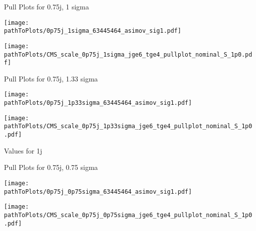 \begin{frame}{Pull Plots for 0.75j, 1 sigma}
\begin{minipage}{0.48\textwidth}
\centering
\texttt{[image: \\pathToPlots/0p75j\_1sigma\_63445464\_asimov\_sig1.pdf]}
\end{minipage}
\hfill
\begin{minipage}{0.48\textwidth}
\texttt{[image: \\pathToPlots/CMS\_scale\_0p75j\_1sigma\_jge6\_tge4\_pullplot\_nominal\_S\_1p0.pdf]}
\end{minipage}
\end{frame}


\begin{frame}{Pull Plots for 0.75j, 1.33 sigma}
\begin{minipage}{0.48\textwidth}
\centering
\texttt{[image: \\pathToPlots/0p75j\_1p33sigma\_63445464\_asimov\_sig1.pdf]}
\end{minipage}
\hfill
\begin{minipage}{0.48\textwidth}
\texttt{[image: \\pathToPlots/CMS\_scale\_0p75j\_1p33sigma\_jge6\_tge4\_pullplot\_nominal\_S\_1p0.pdf]}
\end{minipage}
\end{frame}


\begin{frame}{Values for 1j}

\end{frame}

\begin{frame}{Pull Plots for 0.75j, 0.75 sigma}
\begin{minipage}{0.48\textwidth}
\centering
\texttt{[image: \\pathToPlots/0p75j\_0p75sigma\_63445464\_asimov\_sig1.pdf]}
\end{minipage}
\hfill
\begin{minipage}{0.48\textwidth}
\texttt{[image: \\pathToPlots/CMS\_scale\_0p75j\_0p75sigma\_jge6\_tge4\_pullplot\_nominal\_S\_1p0.pdf]}
\end{minipage}
\end{frame}
